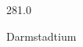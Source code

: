 \documentclass[12pt]{article}
\begin{document}
\hfill{}
\vfill
\begin{center}
  {\fontsize{50}{60}
  }

  281.0

Darmstadtium
\end{center}
\vfill
\end{document}
